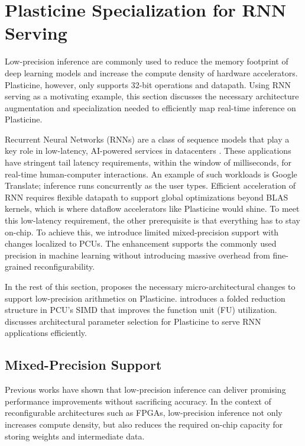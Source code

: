 \section{Plasticine Specialization for RNN Serving} \label{sec:rnn_arch}

Low-precision inference are commonly used to reduce the memory footprint of deep learning models and
increase the compute density of hardware accelerators.
Plasticine, however, only supports 32-bit operations and datapath.
Using RNN serving as a motivating example, this section discusses the necessary architecture augmentation and
specialization needed to efficiently map real-time inference on Plasticine.

Recurrent Neural Networks (RNNs) are a class of sequence models that play a key role
in low-latency, AI-powered services in datacenters \cite{fowers2018configurable, jouppi2017datacenter}.
These applications have stringent tail latency requirements, within the window of milliseconds,
for real-time human-computer interactions.
An example of such workloads is
Google Translate; inference runs concurrently as the user types.
Efficient acceleration of RNN requires flexible datapath to support global optimizations beyond
BLAS kernels, which is where dataflow accelerators like Plasticine would shine.
To meet this low-latency requirement, the other prerequisite is that everything has to stay on-chip.
To achieve this, we introduce limited mixed-precision support with changes localized to PCUs. 
The enhancement supports the commonly used precision in machine learning without introducing massive
overhead from fine-grained reconfigurability.

In the rest of this section,  proposes the necessary micro-architectural changes to support low-precision arithmetics on Plasticine.
 introduces a folded reduction structure in PCU's SIMD that improves the function
unit (FU) utilization.
 discusses architectural parameter selection for Plasticine to serve RNN applications efficiently.

\subsection{Mixed-Precision Support} \label{sec:lowprec}
\label{sec:arch:varprec}
Previous works \cite{fowers2018configurable, jouppi2017datacenter}
  have shown that low-precision inference can deliver promising performance
  improvements without sacrificing accuracy.
In the context of reconfigurable architectures such as FPGAs,
  low-precision inference not only increases compute density,
  but also reduces the required on-chip capacity for
  storing weights and intermediate data.

